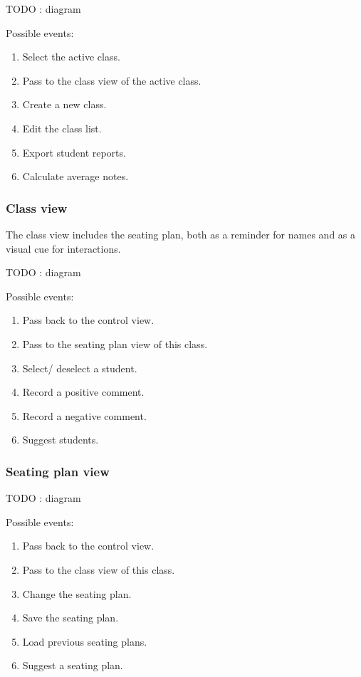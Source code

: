 \documentclass[10pt]{article}
\begin{document}
TODO : diagram

Possible events: 
\begin{enumerate}
\item Select the active class.
\item Pass to the class view of the active class.
\item Create a new class.
\item Edit the class list.
\item Export student reports.
\item Calculate average notes.
\end{enumerate}

\subsubsection{Class view}

The class view includes the seating plan, both as a reminder for names and as a visual cue for interactions.

TODO : diagram

Possible events: 
\begin{enumerate}
\item Pass back to the control view.
\item Pass to the seating plan view of this class.
\item Select/ deselect a student.
\item Record a positive comment.
\item Record a negative comment.
\item Suggest students.
\end{enumerate}

\subsubsection{Seating plan view}

TODO : diagram

Possible events: 
\begin{enumerate}
\item Pass back to the control view.
\item Pass to the class view of this class.
\item Change the seating plan.
\item Save the seating plan.
\item Load previous seating plans.
\item Suggest a seating plan.
\end{enumerate}
\end{document}
